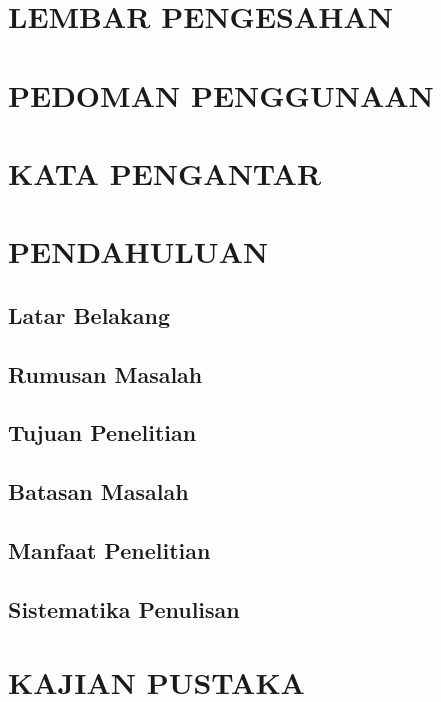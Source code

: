 \documentclass[12pt,a4paper]{report}
\begin{document}
\chapter*{\centering LEMBAR PENGESAHAN}

\chapter*{\centering PEDOMAN PENGGUNAAN}

\chapter*{\centering KATA PENGANTAR}


\normalsize {\tableofcontents}
\normalsize {\listoffigures}
\normalsize {\listoftables}

\chapter{PENDAHULUAN}
\setcounter{page}{8}				%
	\section{Latar Belakang}
		
	\section{Rumusan Masalah}
		
	\section{Tujuan Penelitian}
		
	\section{Batasan Masalah}
		
	\section{Manfaat Penelitian}
	
	\section{Sistematika Penulisan}
	
\chapter{KAJIAN PUSTAKA}
\end{document}
